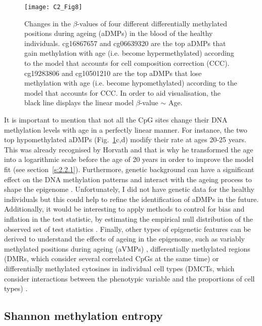 \begin{figure}[htbp!] 
	\centering    
	\texttt{[image: C2\_Fig8]}
	\caption[Changes in the $\beta$-values of four different aDMPs]{Changes in the $\beta$-values of four different differentially methylated positions during ageing (aDMPs) in the blood of the healthy individuals. cg16867657 and cg06639320 are the top aDMPs that gain methylation with age (i.e. become hypermethylated) according to the model that accounts for cell composition correction (CCC). cg19283806 and cg10501210 are the top aDMPs that lose methylation with age (i.e. become hypomethylated) according to the model that accounts for CCC. In order to aid visualisation, the black line displays the linear model $\beta$-value $\sim$ Age.}
	\label{fig:c2_fig8}
\end{figure}

\bigskip

It is important to mention that not all the CpG sites change their DNA methylation levels with age in a perfectly linear manner. For instance, the two top hypomethylated aDMPs (Fig.~\ref{fig:c2_fig8}c,d) modify their rate at ages 20-25 years. This was already recognised by Horvath \citep{Horvath2013} and that is why he transformed the age into a logarithmic scale before the age of 20 years in order to improve the model fit (see section~\ref{s:2.2.1}). Furthermore, genetic background can have a significant effect on the DNA methylation patterns and interact with the ageing process to shape the epigenome \citep{Hannum2013,VanDongen2016}. Unfortunately, I did not have genetic data for the healthy individuals but this could help to refine the identification of aDMPs in the future. Additionally, it would be interesting to apply methods to control for bias and inflation in the test statistic, by estimating the empirical null distribution of the observed set of test statistics \citep{VanIterson2017}. Finally, other types of epigenetic features can be derived to understand the effects of ageing in the epigenome, such as variably methylated positions during ageing (\acrshort{aVMPs}) \citep{Slieker2016}, differentially methylated regions (\acrshort{DMRs}, which consider several correlated CpGs at the same time) \citep{Teschendorff2018} or differentially methylated cytosines in individual cell types (\acrshort{DMCTs}, which consider interactions between the phenotypic variable and the proportions of cell types) \citep{Zheng2018}.


\smallskip

\subsection{Shannon methylation entropy} \label{s:2.1.5}

